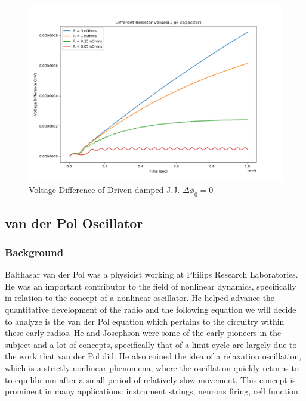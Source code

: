 \documentclass[12pt]{article}
\begin{document}
\begin{figure}
\caption{Voltage Difference of Driven-damped J.J. $\Delta \phi_0 = 0$}
\begin{center}
\includegraphics[scale=0.50]{dd-jjresphase0v.png}
\end{center}
\end{figure}


\subsection{van der Pol Oscillator}

\subsubsection{Background}

Balthasar van der Pol was a physicist working at Philips Research Laboratories.  He was an important contributor to the field of nonlinear dynamics, specifically in relation to the concept of a nonlinear oscillator.  He helped advance the quantitative development of the radio and the following equation we will decide to analyze is the van der Pol equation which pertains to the circuitry within these early radios.  He and Josephson were some of the early pioneers in the subject and a lot of concepts, specifically that of a limit cycle are largely due to the work that van der Pol did.  He also coined the idea of a relaxation oscillation, which is a strictly nonlinear phenomena, where the oscillation quickly returns to to equilibrium after a small period of relatively slow movement.  This concept is prominent in many applications: instrument strings, neurons firing, cell function.
\end{document}
